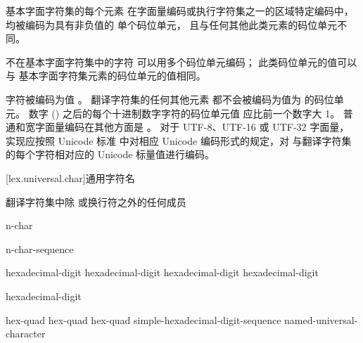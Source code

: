 \pnum
基本字面字符集的每个元素
在字面量编码或执行字符集之一的区域特定编码中，均被编码为具有非负值的
单个码位单元，
且与任何其他此类元素的码位单元不同。
\begin{note}
不在基本字面字符集中的字符
可以用多个码位单元编码；
此类码位单元的值可以与
基本字面字符集元素的码位单元的值相同。
\end{note}
%
%
 字符被编码为值 。
翻译字符集的任何其他元素
都不会被编码为值为  的码位单元。
数字  () 之后的每个十进制数字字符的码位单元值
应比前一个数字大 1。
普通和宽字面量编码在其他方面是
。
%
%
%
对于 UTF-8、UTF-16 或 UTF-32 字面量，
实现应按照 Unicode 标准
中对相应 Unicode 编码形式的规定，对
与翻译字符集的每个字符相对应的 Unicode 标量值进行编码。

[lex.universal.char]{通用字符名}

\begin{bnf}
\br
     \textnormal{翻译字符集中除  或换行符之外的任何成员}
\end{bnf}

\begin{bnf}
\br
    n-char 
\end{bnf}

\begin{bnf}
\br
     n-char-sequence \terminal{\}}
\end{bnf}

\begin{bnf}
\br
    hexadecimal-digit hexadecimal-digit hexadecimal-digit hexadecimal-digit
\end{bnf}

\begin{bnf}
\br
    hexadecimal-digit 
\end{bnf}

\begin{bnf}
\br
     hex-quad\br
     hex-quad hex-quad\br
     simple-hexadecimal-digit-sequence \terminal{\}}\br
    named-universal-character
\end{bnf}

